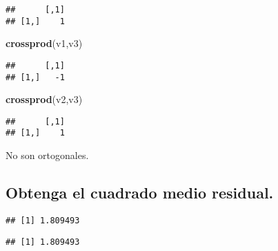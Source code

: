 \documentclass[
]{article}
\newenvironment{Shaded}{\begin{snugshade}}{\end{snugshade}}
\newcommand{\DecValTok}[1]{\textcolor[rgb]{0.00,0.00,0.81}{#1}}
\newcommand{\FunctionTok}[1]{\textcolor[rgb]{0.13,0.29,0.53}{\textbf{#1}}}
\newcommand{\NormalTok}[1]{#1}
\newcommand{\OtherTok}[1]{\textcolor[rgb]{0.56,0.35,0.01}{#1}}
\newcommand{\SpecialCharTok}[1]{\textcolor[rgb]{0.81,0.36,0.00}{\textbf{#1}}}
\begin{document}
\begin{verbatim}
##      [,1]
## [1,]    1
\end{verbatim}

\begin{Shaded}
\begin{Highlighting}[]
\FunctionTok{crossprod}\NormalTok{(v1,v3)}
\end{Highlighting}
\end{Shaded}

\begin{verbatim}
##      [,1]
## [1,]   -1
\end{verbatim}

\begin{Shaded}
\begin{Highlighting}[]
\FunctionTok{crossprod}\NormalTok{(v2,v3)}
\end{Highlighting}
\end{Shaded}

\begin{verbatim}
##      [,1]
## [1,]    1
\end{verbatim}

No son ortogonales.

\hypertarget{obtenga-el-cuadrado-medio-residual.}{%
\subsection{Obtenga el cuadrado medio
residual.}\label{obtenga-el-cuadrado-medio-residual.}}

\begin{Shaded}
\end{Shaded}

\begin{verbatim}
## [1] 1.809493
\end{verbatim}

\begin{verbatim}
## [1] 1.809493
\end{verbatim}
\end{document}
